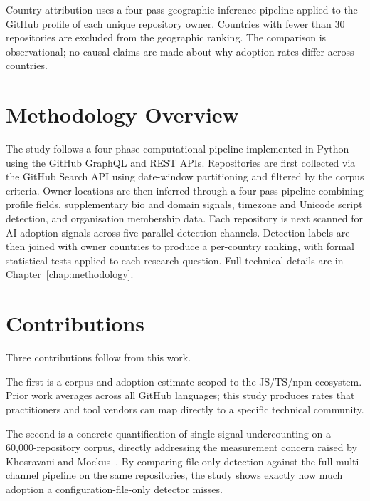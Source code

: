 Country attribution uses a four-pass geographic inference pipeline applied to the GitHub profile of each unique repository owner. Countries with fewer than 30 repositories are excluded from the geographic ranking. The comparison is observational; no causal claims are made about why adoption rates differ across countries.

\section{Methodology Overview}
\label{sec:intro:method}

The study follows a four-phase computational pipeline implemented in Python using the GitHub GraphQL and REST APIs. Repositories are first collected via the GitHub Search API using date-window partitioning and filtered by the corpus criteria. Owner locations are then inferred through a four-pass pipeline combining profile fields, supplementary bio and domain signals, timezone and Unicode script detection, and organisation membership data. Each repository is next scanned for AI adoption signals across five parallel detection channels. Detection labels are then joined with owner countries to produce a per-country ranking, with formal statistical tests applied to each research question. Full technical details are in Chapter~\ref{chap:methodology}.

\section{Contributions}
\label{sec:intro:contributions}

Three contributions follow from this work.

The first is a corpus and adoption estimate scoped to the JS/TS/npm ecosystem. Prior work averages across all GitHub languages; this study produces rates that practitioners and tool vendors can map directly to a specific technical community.

The second is a concrete quantification of single-signal undercounting on a 60,000-repository corpus, directly addressing the measurement concern raised by Khosravani and Mockus~\cite{khosravani2026}. By comparing file-only detection against the full multi-channel pipeline on the same repositories, the study shows exactly how much adoption a configuration-file-only detector misses.

